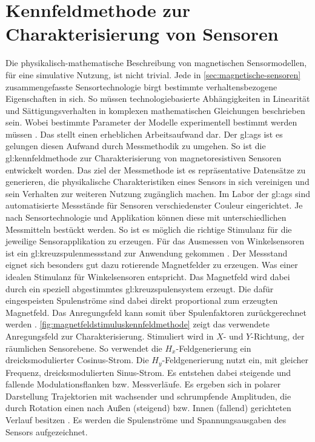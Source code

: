 %

\section{Kennfeldmethode zur Charakterisierung von Sensoren}\label{sec:kennfeldmethode-zur-charakterisierung}


Die physikalisch-mathematische Beschreibung von magnetischen Sensormodellen, für eine simulative Nutzung, ist nicht trivial. Jede in \autoref{sec:magnetische-sensoren} zusammengefasste Sensortechnologie birgt bestimmte verhaltensbezogene Eigenschaften in sich. So müssen technologiebasierte Abhängigkeiten in Linearität und Sättigungsverhalten in komplexen mathematischen Gleichungen beschrieben sein. Wobei bestimmte Parameter der Modelle experimentell bestimmt werden müssen \cite{Schuethe2019}. Das stellt einen erheblichen Arbeitsaufwand dar. Der \gls{gl:ags} ist es gelungen diesen Aufwand durch Messmethodik zu umgehen. So ist die \gls{gl:kennfeldmethode} zur Charakterisierung von magnetoresistiven Sensoren entwickelt worden. Das ziel der Messmethode ist es repräsentative Datensätze zu generieren, die physikalische Charakteristiken eines Sensors in sich vereinigen und sein Verhalten zur weiteren Nutzung zugänglich machen.
\newline
Im Labor der \gls{gl:ags} sind automatisierte Messstände für Sensoren verschiedenster Couleur eingerichtet. Je nach Sensortechnologie und Applikation können diese mit unterschiedlichen Messmitteln bestückt werden. So ist es möglich die richtige Stimulanz für die jeweilige Sensorapplikation zu erzeugen. Für das Ausmessen von Winkelsensoren ist ein \gls{gl:kreuzspulenmessstand} zur Anwendung gekommen \cite{Schuethe2019}\cite{Schuethe2020}. Der Messstand eignet sich besonders gut dazu rotierende Magnetfelder zu erzeugen. Was einer idealen Stimulanz für Winkelsensoren entspricht. Das Magnetfeld wird dabei durch ein speziell abgestimmtes \gls{gl:kreuzspulensystem} erzeugt. Die dafür eingespeisten Spulenströme sind dabei direkt proportional zum erzeugten Magnetfeld. Das Anregungsfeld kann somit über Spulenfaktoren zurückgerechnet werden \cite{Schuethe2020}.
\newline
\autoref{fig:magnetfeldstimuluskennfeldmethode} zeigt das verwendete Anregungsfeld zur Charakterisierung. Stimuliert wird in $X$- und $Y$-Richtung, der räumlichen Sensorebene. So verwendet die $H_x$-Feldgenerierung ein dreicksmodulierter Cosinus-Strom. Die $H_y$-Feldgenerierung nutzt ein, mit gleicher Frequenz, dreicksmodulierten Sinus-Strom. Es entstehen dabei steigende und fallende Modulationsflanken bzw. Messverläufe. Es ergeben sich in polarer Darstellung Trajektorien mit wachsender und schrumpfende Amplituden, die durch Rotation einen nach Außen (steigend) bzw. Innen (fallend) gerichteten Verlauf besitzen \cite{Schuethe2019}. Es werden die Spulenströme und Spannungsausgaben des Sensors aufgezeichnet.

